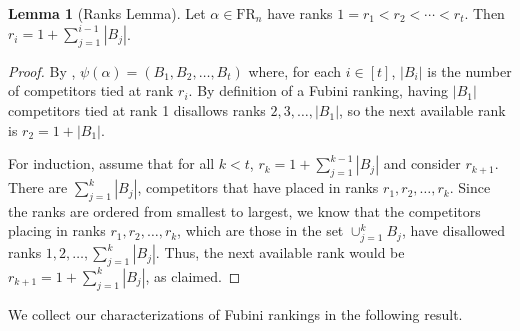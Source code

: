 \documentclass{amsart}
\theoremstyle{definition}
\newtheorem{lemma}{Lemma}[section]
\theoremstyle{definition}
\theoremstyle{remark}
\newcommand{\FR}[1]{\mathrm{FR}_{#1}}
\begin{document}
\begin{lemma}[Ranks Lemma]\label{lemma: ranks determined by number of tied competitors}
    Let $\alpha\in\FR{n}$ have ranks $1=r_1<r_2< \cdots< r_t$.
    Then $r_i = 1 + \sum_{j=1}^{i-1} |B_j|$.
\end{lemma}
\begin{proof}
  By , $\psi(\alpha)=(B_1,B_2,\ldots,B_t)$ where, for each $i\in[t]$, $|B_i|$ is the number of competitors tied at rank $r_i$. 
  By definition of a Fubini ranking, having $|B_1|$ competitors tied at rank 1 disallows ranks $2,3,\ldots,|B_1|$, so the next available rank is $r_2=1+|B_1|$. 
  
  For induction, assume that for all $k<t$, $r_k=1+\sum_{j=1}^{k-1}|B_j|$ and consider $r_{k+1}$. 
  There are $\sum_{j=1}^{k}|B_j|$, competitors that have placed in ranks $r_1,r_2,\ldots,r_{k}$. 
  Since the ranks are ordered from smallest to largest, we know that the competitors placing in ranks $r_1,r_2,\ldots,r_k$, which are those in the set $\cup_{j=1}^{k}B_j$, have 
  disallowed ranks $1,2,\ldots,\sum_{j=1}^k|B_j|$.
  Thus, the next available rank would be $r_{k+1}=1+\sum_{j=1}^k|B_j|$, as claimed. 
\end{proof}

We collect our characterizations of Fubini rankings in the following result.
\end{document}
